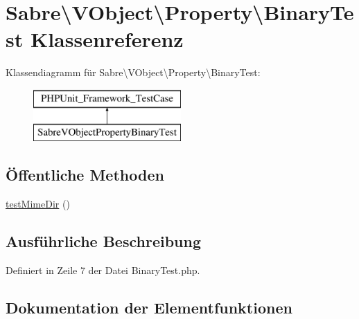 \hypertarget{class_sabre_1_1_v_object_1_1_property_1_1_binary_test}{}\section{Sabre\textbackslash{}V\+Object\textbackslash{}Property\textbackslash{}Binary\+Test Klassenreferenz}
\label{class_sabre_1_1_v_object_1_1_property_1_1_binary_test}
Klassendiagramm für Sabre\textbackslash{}V\+Object\textbackslash{}Property\textbackslash{}Binary\+Test\+:\begin{figure}[H]
\begin{center}
\leavevmode
\includegraphics[height=2.000000cm]{class_sabre_1_1_v_object_1_1_property_1_1_binary_test}
\end{center}
\end{figure}
\subsection*{Öffentliche Methoden}
\begin{DoxyCompactItemize}
\item 
\mbox{\hyperlink{class_sabre_1_1_v_object_1_1_property_1_1_binary_test_aabe522506fd811c9f2914745c46ed391}{test\+Mime\+Dir}} ()
\end{DoxyCompactItemize}


\subsection{Ausführliche Beschreibung}


Definiert in Zeile 7 der Datei Binary\+Test.\+php.



\subsection{Dokumentation der Elementfunktionen}
\mbox{\label{class_sabre_1_1_v_object_1_1_property_1_1_binary_test_aabe522506fd811c9f2914745c46ed391}} 
